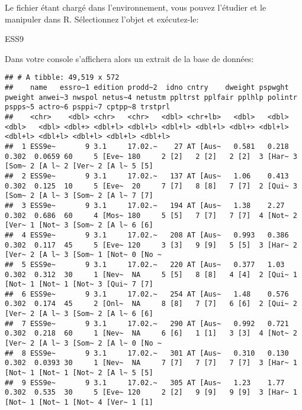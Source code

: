 \documentclass[
]{book}
\newenvironment{Shaded}{\begin{snugshade}}{\end{snugshade}}
\newcommand{\NormalTok}[1]{#1}
\begin{document}
Le fichier étant chargé dans l'environnement, vous pouvez l'étudier et le manipuler dans R. Sélectionnez l'objet et exécutez-le:

\begin{Shaded}
\begin{Highlighting}[]
\NormalTok{ESS9}
\end{Highlighting}
\end{Shaded}

Dans votre console s'affichera alors un extrait de la base de données:

\begin{verbatim}
## # A tibble: 49,519 x 572
##    name   essro~1 edition prodd~2  idno cntry    dweight pspwght pweight anwei~3 nwspol netus~4 netustm ppltrst pplfair pplhlp polintr pspps~5 actro~6 psppi~7 cptpp~8 trstprl
##    <chr>    <dbl> <chr>   <chr>   <dbl> <chr+lb>   <dbl>   <dbl>   <dbl>   <dbl> <dbl+> <dbl+l> <dbl+l> <dbl+l> <dbl+l> <dbl+> <dbl+l> <dbl+l> <dbl+l> <dbl+l> <dbl+l> <dbl+l>
##  1 ESS9e~       9 3.1     17.02.~    27 AT [Aus~   0.581   0.218   0.302  0.0659 60     5 [Eve~ 180     2 [2]   2 [2]   2 [2]  3 [Har~ 3 [Som~ 2 [A l~ 2 [Ver~ 2 [A l~ 5 [5]  
##  2 ESS9e~       9 3.1     17.02.~   137 AT [Aus~   1.06    0.413   0.302  0.125  10     5 [Eve~  20     7 [7]   8 [8]   7 [7]  2 [Qui~ 3 [Som~ 2 [A l~ 3 [Som~ 2 [A l~ 7 [7]  
##  3 ESS9e~       9 3.1     17.02.~   194 AT [Aus~   1.38    2.27    0.302  0.686  60     4 [Mos~ 180     5 [5]   7 [7]   7 [7]  4 [Not~ 2 [Ver~ 1 [Not~ 3 [Som~ 2 [A l~ 6 [6]  
##  4 ESS9e~       9 3.1     17.02.~   208 AT [Aus~   0.993   0.386   0.302  0.117  45     5 [Eve~ 120     3 [3]   9 [9]   5 [5]  3 [Har~ 2 [Ver~ 2 [A l~ 3 [Som~ 1 [Not~ 0 [No ~
##  5 ESS9e~       9 3.1     17.02.~   220 AT [Aus~   0.377   1.03    0.302  0.312  30     1 [Nev~  NA     5 [5]   8 [8]   4 [4]  2 [Qui~ 1 [Not~ 1 [Not~ 1 [Not~ 3 [Qui~ 7 [7]  
##  6 ESS9e~       9 3.1     17.02.~   254 AT [Aus~   1.48    0.576   0.302  0.174  45     2 [Onl~  NA     8 [8]   7 [7]   6 [6]  2 [Qui~ 2 [Ver~ 2 [A l~ 3 [Som~ 2 [A l~ 6 [6]  
##  7 ESS9e~       9 3.1     17.02.~   290 AT [Aus~   0.992   0.721   0.302  0.218  60     1 [Nev~  NA     6 [6]   1 [1]   3 [3]  4 [Not~ 2 [Ver~ 2 [A l~ 3 [Som~ 2 [A l~ 0 [No ~
##  8 ESS9e~       9 3.1     17.02.~   301 AT [Aus~   0.310   0.130   0.302  0.0393 30     1 [Nev~  NA     7 [7]   7 [7]   7 [7]  3 [Har~ 1 [Not~ 1 [Not~ 1 [Not~ 2 [A l~ 5 [5]  
##  9 ESS9e~       9 3.1     17.02.~   305 AT [Aus~   1.23    1.77    0.302  0.535  30     5 [Eve~ 120     2 [2]   9 [9]   9 [9]  3 [Har~ 1 [Not~ 1 [Not~ 1 [Not~ 4 [Ver~ 1 [1]  

\end{verbatim}
\end{document}
